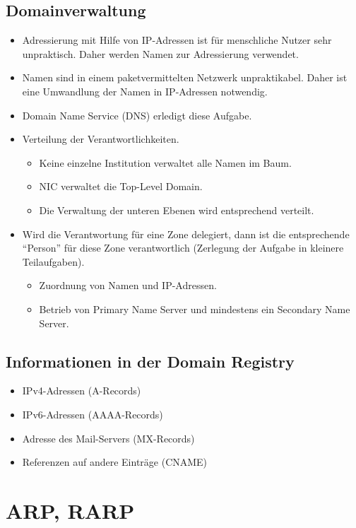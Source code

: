 \documentclass{article} %
\begin{document}
\subsection{Domainverwaltung}
\begin{itemize}
	\item Adressierung mit Hilfe von IP-Adressen ist für menschliche Nutzer sehr unpraktisch. Daher werden Namen zur Adressierung verwendet.
	\item Namen sind in einem paketvermittelten Netzwerk unpraktikabel. Daher ist eine Umwandlung der Namen in IP-Adressen notwendig.
	\item Domain Name Service (DNS) erledigt diese Aufgabe.
	\item Verteilung der Verantwortlichkeiten.
	\begin{itemize}
		\item Keine einzelne Institution verwaltet alle Namen im Baum.
		\item NIC verwaltet die Top-Level Domain.
		\item Die Verwaltung der unteren Ebenen wird entsprechend verteilt.
	\end{itemize}
	\item Wird die Verantwortung für eine Zone delegiert, dann ist die entsprechende "`Person"' für diese Zone verantwortlich (Zerlegung der Aufgabe in kleinere Teilaufgaben).
	\begin{itemize}
		\item Zuordnung von Namen und IP-Adressen.
		\item Betrieb von Primary Name Server und mindestens ein Secondary Name Server.
	\end{itemize}
\end{itemize}
\subsection{Informationen in der Domain Registry}
\begin{itemize}
	\item IPv4-Adressen (A-Records)
	\item IPv6-Adressen (AAAA-Records)
	\item Adresse des Mail-Servers (MX-Records)
	\item Referenzen auf andere Einträge (CNAME)
\end{itemize}

\section{ARP, RARP}
\end{document}
